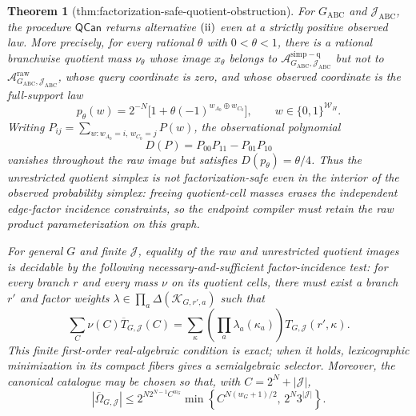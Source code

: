 \documentclass{article}
\newtheorem{theorem}{Theorem}
\begin{document}
\begin{theorem}[thm:factorization-safe-quotient-obstruction]\label{thm:factorization-safe-quotient-obstruction}
For \(G_{\mathrm{ABC}}\) and \(\mathcal J_{\mathrm{ABC}}\), the procedure \(\mathsf{QCan}\) returns alternative \({\rm(ii)}\) even at a strictly positive observed law.  More precisely, for every rational \(\theta\) with \(0<\theta<1\), there is a rational branchwise quotient mass \(\nu_\theta\) whose image \(x_\theta\) belongs to \(\mathcal A_{G_{\mathrm{ABC}},\mathcal J_{\mathrm{ABC}}}^{\mathrm{simp-q}}\) but not to \(\mathcal A_{G_{\mathrm{ABC}},\mathcal J_{\mathrm{ABC}}}^{\mathrm{raw}}\), whose query coordinate is zero, and whose observed coordinate is the full-support law
\[
p_\theta(w)=2^{-N}\bigl[1+\theta(-1)^{w_{A_0}\oplus w_{C_0}}\bigr],
\qquad w\in\{0,1\}^{\mathcal W_H}.
\]
Writing \(P_{ij}=\sum_{w:w_{A_0}=i,\,w_{C_0}=j}P(w)\), the observational polynomial
\[
D(P)=P_{00}P_{11}-P_{01}P_{10}
\]
vanishes throughout the raw image but satisfies \(D(p_\theta)=\theta/4\).  Thus the unrestricted quotient simplex is not factorization-safe even in the interior of the observed probability simplex: freeing quotient-cell masses erases the independent edge-factor incidence constraints, so the endpoint compiler must retain the raw product parameterization on this graph.

For general \(G\) and finite \(\mathcal J\), equality of the raw and unrestricted quotient images is decidable by the following necessary-and-sufficient factor-incidence test: for every branch \(r\) and every mass \(\nu\) on its quotient cells, there must exist a branch \(r'\) and factor weights \(\lambda\in\prod_a\Delta(\mathcal K_{G,r',a})\) such that
\[
\sum_C\nu(C)\overline T_{G,\mathcal J}(C)
=\sum_\kappa\left(\prod_a\lambda_a(\kappa_a)\right)T_{G,\mathcal J}(r',\kappa).
\]
This finite first-order real-algebraic condition is exact; when it holds, lexicographic minimization in its compact fibers gives a semialgebraic selector.  Moreover, the canonical catalogue may be chosen so that, with \(C=2^N+|\mathcal J|\),
\[
|\overline\Omega_{G,\mathcal J}|
\le
2^{N2^{N-1}C^{w_G}}
\min\left\{C^{N(w_G+1)/2},\,2^N3^{|\mathcal J|}\right\}.
\]
\end{theorem}
\end{document}
